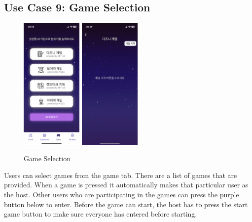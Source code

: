 \documentclass[conference]{IEEEtran}
\begin{document}
    \subsection{Use Case 9: Game Selection}
        \begin{figure}[htbp]
            \centerline{\includegraphics[width=3cm]{Images/screen/game/GAME_LIST.PNG}
            \includegraphics[width=3cm]{Images/screen/game/GAME_STANDBY.PNG}}
            \caption{Game Selection}
            \label{fig}
        \end{figure}
        Users can select games from the game tab. There are a list of games that are provided. When a game is pressed it automatically makes that particular user as the host. Other users who are participating in the games can press the purple button below to enter. Before the game can start, the host has to press the start game button to make sure everyone has entered before starting.\\
\end{document}
